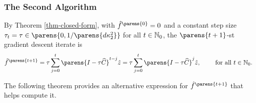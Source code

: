 \subsubsection{The Second Algorithm}

By Theorem \ref{thm-closed-form}, with $\hat{f}^{\parens{0}} = 0$ and a constant step size $\tau_t = \tau \in \parens{0, 1 / \parens{d \kappa_2^2} }$ for all $t \in \mathbb{N}_0$, the $\parens{t+1}$-st gradient descent iterate is 
\begin{align*}
	\hat{f}^{\parens{t+1}} = \tau \sum_{j=0}^t \parens{I - \tau \widehat{C}}^{t - j} \hat{z} = \tau \sum_{j=0}^t \parens{I - \tau \widehat{C}}^{j} \hat{z}, \qquad \text{ for all } t \in \Natural_0. 
\end{align*}

The following theorem provides an alternative expression for $\hat{f}^{\parens{t+1}}$ that helps compute it. 

